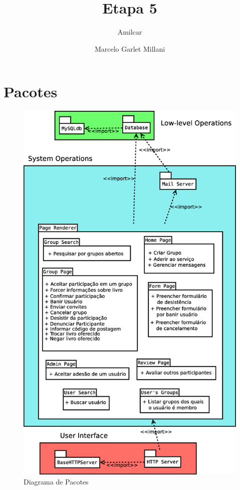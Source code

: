 \documentclass[a4paper]{article}
\title{Etapa 5}
\author{Amilcar \and Marcelo Garlet Millani}
\date{}
\begin{document}
 \maketitle 
 
\section{Pacotes}
 
	\begin{figure}[H]
		\includegraphics[totalheight=0.9\textheight]{pacotes.eps}
		\caption{Diagrama de Pacotes}
	\end{figure}
	
\end{document}
